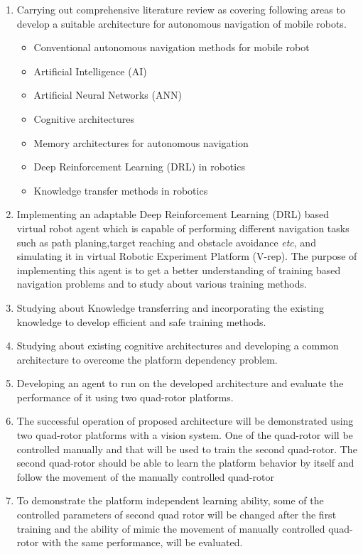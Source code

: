 
\begin{enumerate}
\item Carrying out comprehensive literature review as covering following areas to develop a suitable architecture for autonomous navigation of mobile robots.
	\begin{itemize}
		\item Conventional autonomous navigation methods for mobile robot
		\item Artificial Intelligence (AI)
		\item Artificial Neural Networks (ANN)\cite{R09}
		\item Cognitive architectures
		\item Memory architectures for autonomous navigation
		\item Deep Reinforcement Learning (DRL) in robotics 
		\item Knowledge transfer methods in robotics

	\end{itemize}
	
\item Implementing an adaptable Deep Reinforcement Learning (DRL) based virtual robot agent which is capable of performing different navigation tasks such as path planing,target reaching and obstacle avoidance \textit{etc}, and simulating it in virtual Robotic Experiment Platform (V-rep)\cite{R60}. The purpose of implementing this agent is to get a better understanding of training based navigation problems and to study about various training methods.

\item Studying about Knowledge transferring and incorporating the existing knowledge to develop efficient and safe training methods.

\item Studying about existing cognitive architectures and developing a common architecture to overcome the platform dependency problem.

\item Developing an agent to run on the developed architecture and evaluate the performance of it using two quad-rotor platforms.

\item The successful operation of proposed architecture will be demonstrated using two quad-rotor platforms with a vision system. One of the quad-rotor will be controlled manually and that will be used to train the second quad-rotor. The second quad-rotor should be able to learn the platform behavior by itself and follow the movement of the manually controlled quad-rotor

\item To demonstrate the platform independent learning ability, some of the controlled parameters of second quad rotor will be changed after the first training and the ability of mimic the movement of  manually controlled quad-rotor with the same performance, will be evaluated.



\end{enumerate}